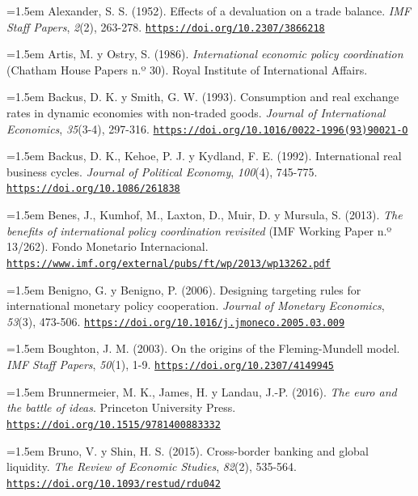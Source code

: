 \documentclass[10pt,a4paper]{article}
\begin{document}
\noindent\hangindent=1.5em Alexander, S. S. (1952). Effects of a devaluation on a trade balance. \textit{IMF Staff Papers}, \textit{2}(2), 263-278. \href{https://doi.org/10.2307/3866218}{\nolinkurl{https://doi.org/10.2307/3866218}}

\noindent\hangindent=1.5em Artis, M. y Ostry, S. (1986). \textit{International economic policy coordination} (Chatham House Papers n.º 30). Royal Institute of International Affairs.

\noindent\hangindent=1.5em Backus, D. K. y Smith, G. W. (1993). Consumption and real exchange rates in dynamic economies with non-traded goods. \textit{Journal of International Economics}, \textit{35}(3-4), 297-316. \href{https://doi.org/10.1016/0022-1996(93)90021-O}{\nolinkurl{https://doi.org/10.1016/0022-1996(93)90021-O}}

\noindent\hangindent=1.5em Backus, D. K., Kehoe, P. J. y Kydland, F. E. (1992). International real business cycles. \textit{Journal of Political Economy}, \textit{100}(4), 745-775. \href{https://doi.org/10.1086/261838}{\nolinkurl{https://doi.org/10.1086/261838}}

\noindent\hangindent=1.5em Benes, J., Kumhof, M., Laxton, D., Muir, D. y Mursula, S. (2013). \textit{The benefits of international policy coordination revisited} (IMF Working Paper n.º 13/262). Fondo Monetario Internacional. \href{https://www.imf.org/external/pubs/ft/wp/2013/wp13262.pdf}{\nolinkurl{https://www.imf.org/external/pubs/ft/wp/2013/wp13262.pdf}}

\noindent\hangindent=1.5em Benigno, G. y Benigno, P. (2006). Designing targeting rules for international monetary policy cooperation. \textit{Journal of Monetary Economics}, \textit{53}(3), 473-506. \href{https://doi.org/10.1016/j.jmoneco.2005.03.009}{\nolinkurl{https://doi.org/10.1016/j.jmoneco.2005.03.009}}

\noindent\hangindent=1.5em Boughton, J. M. (2003). On the origins of the Fleming-Mundell model. \textit{IMF Staff Papers}, \textit{50}(1), 1-9. \href{https://doi.org/10.2307/4149945}{\nolinkurl{https://doi.org/10.2307/4149945}}

\noindent\hangindent=1.5em Brunnermeier, M. K., James, H. y Landau, J.-P. (2016). \textit{The euro and the battle of ideas}. Princeton University Press. \href{https://doi.org/10.1515/9781400883332}{\nolinkurl{https://doi.org/10.1515/9781400883332}}

\noindent\hangindent=1.5em Bruno, V. y Shin, H. S. (2015). Cross-border banking and global liquidity. \textit{The Review of Economic Studies}, \textit{82}(2), 535-564. \href{https://doi.org/10.1093/restud/rdu042}{\nolinkurl{https://doi.org/10.1093/restud/rdu042}}
\end{document}
